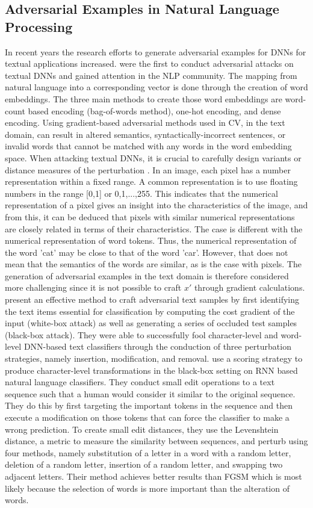 \subsection{Adversarial Examples in Natural Language Processing}
In recent years the research efforts to generate adversarial examples for DNNs for textual applications increased. \cite{Jia2017AdversarialEF} were the first to conduct adversarial attacks on textual DNNs and gained attention in the NLP community. 
The mapping from natural language into a corresponding vector is done through the creation of word embeddings. The three main methods to create those word embeddings are word-count based encoding (bag-of-words method), one-hot encoding, and dense encoding.
Using gradient-based adversarial methods used in CV, in the text domain, can result in altered semantics, syntactically-incorrect sentences, or invalid words that cannot be matched with any words in the word embedding space. When attacking textual DNNs, it is crucial to carefully design variants or distance measures of the perturbation \cite{zhang2019adversarial}.
In an image, each pixel has a number representation within a fixed range.  A common representation is to use floating numbers in the range [0,1] or {0,1,...,255}. This indicates that the numerical representation of a pixel gives an insight into the characteristics of the image, and from this, it can be deduced that pixels with similar numerical representations are closely related in terms of their characteristics.
The case is different with the numerical representation of word tokens. 
Thus, the numerical representation of the word 'cat' may be close to that of the word 'car'.
However, that does not mean that the semantics of the words are similar, as is the case with pixels. The generation of adversarial examples in the text domain is therefore considered more challenging\cite{carlini2018audio} since it is not possible to craft \(x'\) through gradient calculations. 
\cite{liang2017deep} present an effective method to craft adversarial text samples by first identifying the text items essential for classification by computing the cost gradient of the input (white-box attack) as well as generating a series of occluded test samples (black-box attack). They were able to successfully fool character-level and word-level DNN-based text classifiers through the conduction of three perturbation strategies, namely insertion, modification, and removal. 
\cite{gao2018black} use a scoring strategy to produce character-level transformations in the black-box setting on RNN based natural language classifiers. They conduct small edit operations to a text sequence such that a human would consider it similar to the original sequence. They do this by first targeting the important tokens in the sequence and then execute a modification on those tokens that can force the classifier to make a wrong prediction. To create small edit distances, they use the Levenshtein distance, a metric to measure the similarity between sequences, and perturb using four methods, namely substitution of a letter in a word with a random letter, deletion of a random letter, insertion of a random letter, and swapping two adjacent letters. Their method achieves better results than FGSM  which is most likely because the selection of words is more important than the alteration of words. 
